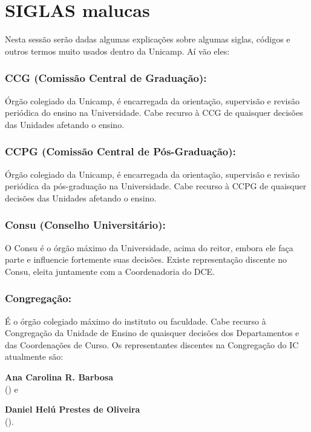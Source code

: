 
\section{SIGLAS malucas}

Nesta sessão serão dadas algumas explicações sobre algumas siglas, códigos e
outros termos muito usados dentro da Unicamp. Aí vão eles:

\subsubsection{CCG (Comissão Central de Graduação):} Órgão colegiado da
Unicamp, é encarregada da orientação, supervisão e revisão periódica do ensino
na Universidade. Cabe recurso à CCG de quaisquer decisões das Unidades afetando
o ensino.

\subsubsection{CCPG (Comissão Central de Pós-Graduação):} Órgão colegiado da
Unicamp, é encarregada da orientação, supervisão e revisão periódica da
pós-graduação na Universidade. Cabe recurso à CCPG de quaisquer decisões das
Unidades afetando o ensino.

\subsubsection{Consu (Conselho Universitário):} O Consu é o órgão máximo da
Universidade, acima do reitor, embora ele faça parte e influencie fortemente
suas decisões. Existe representação discente no Consu, eleita juntamente com a
Coordenadoria do DCE.

\subsubsection{Congregação:} É o órgão colegiado máximo do instituto ou
faculdade.  Cabe recurso à Congregação da Unidade de Ensino de quaisquer
decisões dos Departamentos e das Coordenações de Curso. Os representantes
discentes na Congregação do IC atualmente são:

\begin{compactitemize}
\item \textbf{Ana Carolina R. Barbosa}
  \\() e
\item \textbf{Daniel Helú Prestes de Oliveira}
  \\().
\end{compactitemize}

